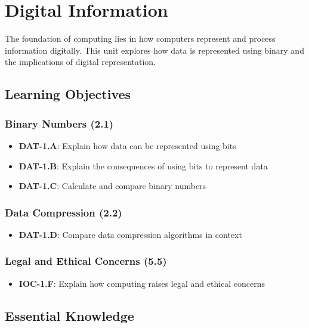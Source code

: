 \chapter{Digital Information}

The foundation of computing lies in how computers represent and process information digitally. This unit explores how data is represented using binary and the implications of digital representation.

\section*{Learning Objectives}

\subsection*{Binary Numbers (2.1)}
\begin{itemize}[label=--]
    \item \textbf{DAT-1.A}: Explain how data can be represented using bits
    \item \textbf{DAT-1.B}: Explain the consequences of using bits to represent data
    \item \textbf{DAT-1.C}: Calculate and compare binary numbers
\end{itemize}

\subsection*{Data Compression (2.2)}
\begin{itemize}[label=--]
    \item \textbf{DAT-1.D}: Compare data compression algorithms in context
\end{itemize}

\subsection*{Legal and Ethical Concerns (5.5)}
\begin{itemize}[label=--]
    \item \textbf{IOC-1.F}: Explain how computing raises legal and ethical concerns
\end{itemize}

\section*{Essential Knowledge}

